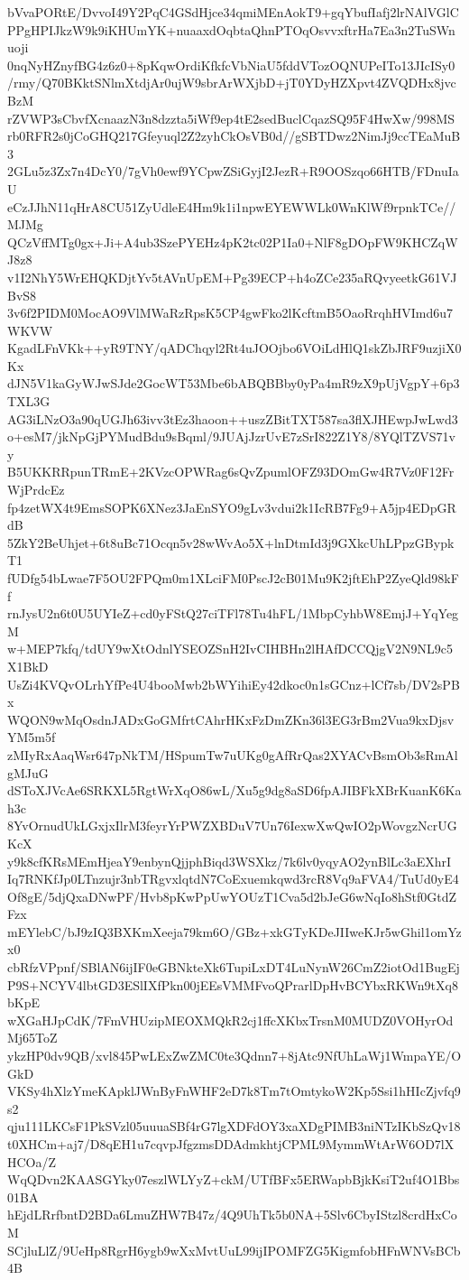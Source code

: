 bVvaPORtE/DvvoI49Y2PqC4GSdHjce34qmiMEnAokT9+gqYbufIafj2lrNAlVGlC
PPgHPIJkzW9k9iKHUmYK+nuaaxdOqbtaQhnPTOqOsvvxftrHa7Ea3n2TuSWnuoji
0nqNyHZnyfBG4z6z0+8pKqwOrdiKfkfcVbNiaU5fddVTozOQNUPeITo13JIcISy0
/rmy/Q70BKktSNlmXtdjAr0ujW9sbrArWXjbD+jT0YDyHZXpvt4ZVQDHx8jvcBzM
rZVWP3sCbvfXcnaazN3n8dzzta5iWf9ep4tE2sedBuclCqazSQ95F4HwXw/998MS
rb0RFR2s0jCoGHQ217Gfeyuql2Z2zyhCkOsVB0d//gSBTDwz2NimJj9ccTEaMuB3
2GLu5z3Zx7n4DcY0/7gVh0ewf9YCpwZSiGyjI2JezR+R9OOSzqo66HTB/FDnuIaU
eCzJJhN11qHrA8CU51ZyUdleE4Hm9k1i1npwEYEWWLk0WnKlWf9rpnkTCe//MJMg
QCzVffMTg0gx+Ji+A4ub3SzePYEHz4pK2tc02P1Ia0+NlF8gDOpFW9KHCZqWJ8z8
v1I2NhY5WrEHQKDjtYv5tAVnUpEM+Pg39ECP+h4oZCe235aRQvyeetkG61VJBvS8
3v6f2PIDM0MocAO9VlMWaRzRpsK5CP4gwFko2lKcftmB5OaoRrqhHVImd6u7WKVW
KgadLFnVKk++yR9TNY/qADChqyl2Rt4uJOOjbo6VOiLdHlQ1skZbJRF9uzjiX0Kx
dJN5V1kaGyWJwSJde2GocWT53Mbe6bABQBBby0yPa4mR9zX9pUjVgpY+6p3TXL3G
AG3iLNzO3a90qUGJh63ivv3tEz3haoon++uszZBitTXT587sa3flXJHEwpJwLwd3
o+esM7/jkNpGjPYMudBdu9sBqml/9JUAjJzrUvE7zSrI822Z1Y8/8YQlTZVS71vy
B5UKKRRpunTRmE+2KVzcOPWRag6sQvZpumlOFZ93DOmGw4R7Vz0F12FrWjPrdcEz
fp4zetWX4t9EmsSOPK6XNez3JaEnSYO9gLv3vdui2k1IcRB7Fg9+A5jp4EDpGRdB
5ZkY2BeUhjet+6t8uBc71Ocqn5v28wWvAo5X+lnDtmId3j9GXkcUhLPpzGBypkT1
fUDfg54bLwae7F5OU2FPQm0m1XLciFM0PscJ2cB01Mu9K2jftEhP2ZyeQld98kFf
rnJysU2n6t0U5UYIeZ+cd0yFStQ27ciTFl78Tu4hFL/1MbpCyhbW8EmjJ+YqYegM
w+MEP7kfq/tdUY9wXtOdnlYSEOZSnH2IvCIHBHn2lHAfDCCQjgV2N9NL9c5X1BkD
UsZi4KVQvOLrhYfPe4U4booMwb2bWYihiEy42dkoc0n1sGCnz+lCf7sb/DV2sPBx
WQON9wMqOsdnJADxGoGMfrtCAhrHKxFzDmZKn36l3EG3rBm2Vua9kxDjsvYM5m5f
zMIyRxAaqWsr647pNkTM/HSpumTw7uUKg0gAfRrQas2XYACvBsmOb3sRmAlgMJuG
dSToXJVcAe6SRKXL5RgtWrXqO86wL/Xu5g9dg8aSD6fpAJIBFkXBrKuanK6Kah3c
8YvOrnudUkLGxjxIlrM3feyrYrPWZXBDuV7Un76IexwXwQwIO2pWovgzNcrUGKcX
y9k8cfKRsMEmHjeaY9enbynQjjphBiqd3WSXkz/7k6lv0yqyAO2ynBlLc3aEXhrI
Iq7RNKfJp0LTnzujr3nbTRgvxlqtdN7CoExuemkqwd3rcR8Vq9aFVA4/TuUd0yE4
Of8gE/5djQxaDNwPF/Hvb8pKwPpUwYOUzT1Cva5d2bJeG6wNqIo8hStf0GtdZFzx
mEYlebC/bJ9zIQ3BXKmXeeja79km6O/GBz+xkGTyKDeJIIweKJr5wGhil1omYzx0
cbRfzVPpnf/SBlAN6ijIF0eGBNkteXk6TupiLxDT4LuNynW26CmZ2iotOd1BugEj
P9S+NCYV4lbtGD3ESlIXfPkn00jEEsVMMFvoQPrarlDpHvBCYbxRKWn9tXq8bKpE
wXGaHJpCdK/7FmVHUzipMEOXMQkR2cj1ffcXKbxTrsnM0MUDZ0VOHyrOdMj65ToZ
ykzHP0dv9QB/xvl845PwLExZwZMC0te3Qdnn7+8jAtc9NfUhLaWj1WmpaYE/OGkD
VKSy4hXlzYmeKApklJWnByFnWHF2eD7k8Tm7tOmtykoW2Kp5Ssi1hHIcZjvfq9s2
qju111LKCsF1PkSVzl05uuuaSBf4rG7lgXDFdOY3xaXDgPIMB3niNTzIKbSzQv18
t0XHCm+aj7/D8qEH1u7cqvpJfgzmsDDAdmkhtjCPML9MymmWtArW6OD7lXHCOa/Z
WqQDvn2KAASGYky07eszlWLYyZ+ckM/UTfBFx5ERWapbBjkKsiT2uf4O1Bbs01BA
hEjdLRrfbntD2BDa6LmuZHW7B47z/4Q9UhTk5b0NA+5Slv6CbyIStzl8crdHxCoM
SCjluLlZ/9UeHp8RgrH6ygb9wXxMvtUuL99ijIPOMFZG5KigmfobHFnWNVsBCb4B
